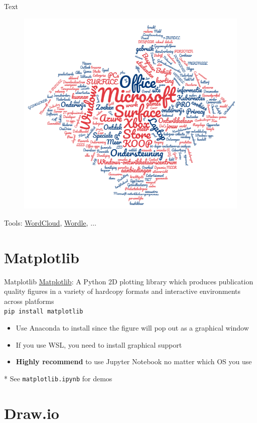 \documentclass{../TexTemplate/myslide}
\begin{document}
\begin{frame}{Text}
\begin{figure}
\centering
\includegraphics[width=0.6\linewidth]{fig/word_cloud.png}
\end{figure}
Tools: \href{https://www.wordclouds.com/}{WordCloud}, \href{http://www.wordle.net/}{Wordle}, $\ldots$
\end{frame}

\section{Matplotlib}
\begin{frame}
\sectionpage
\end{frame}

\begin{frame}[fragile]{Matplotlib}
\href{https://matplotlib.org/index.html}{Matplotlib}: A Python 2D plotting library which produces publication quality figures in a variety of hardcopy formats and interactive environments across platforms\\
\bigskip
\verb'pip install matplotlib'
\begin{itemize}
	\item Use Anaconda to install since the figure will pop out as a graphical window
	\item If you use WSL, you need to install graphical support
	\item \textbf{Highly recommend} to use Jupyter Notebook no matter which OS you use
\end{itemize}
\bigskip
* See \verb'matplotlib.ipynb' for demos
\end{frame}

\section{Draw.io}
\begin{frame}
\sectionpage
\end{frame}
\end{document}
